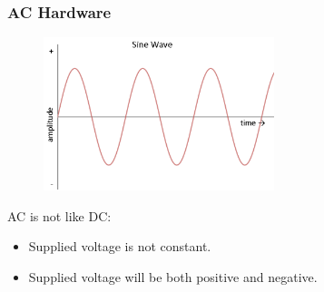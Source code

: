 \documentclass{beamer}
\begin{document}
	\begin{frame}\frametitle{AC Hardware}

		\begin{figure}
			\centering
			\includegraphics[width=0.6\textwidth]{ac-sine-wave.png}
		\end{figure}

		AC is not like DC: 

		\begin{itemize}

			\item Supplied voltage is not constant.

			\item Supplied voltage will be both positive and negative.

		\end{itemize}

		
	\end{frame}
\end{document}
